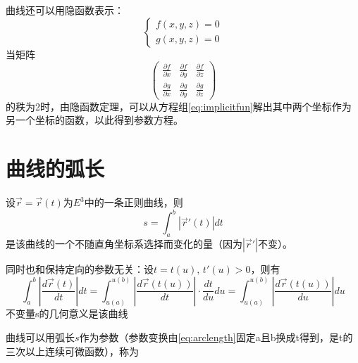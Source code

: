 \documentclass[12pt, a4paper, oneside]{ctexbook}
\newcommand{\hl}[1]{\hlbox{#1}}
\newcounter{#2}
\newcounter{#2}[#1]
\numberwithin{#2}{#1}
\newcommand{\pian}[2]{\frac{\partial #1}{\partial #2}}
\newcommand{\dao}[2]{\frac{d#1}{d#2}}
\newcommand{\ji}[2]{\int_{#1}^{#2}}
\begin{document}
            \begin{deduce}
                曲线还可以用隐函数表示：
                \begin{equation}\label{eq:implicitfun}
                    \begin{cases}
                        f(x,y,z)=0\\
                        g(x,y,z)=0
                    \end{cases}
                \end{equation}
                当矩阵
                \begin{equation}
                    \begin{pmatrix}
                        \pian fx&\pian fy &\pian fz\\
                        \pian gx &\pian gy &\pian gz
                    \end{pmatrix}
                \end{equation}
                的秩为2时，由隐函数定理，可以从方程组\autoref{eq:implicitfun}解出其中两个坐标作为另一个坐标的函数，以此得到参数方程。
            \end{deduce}

            \section{曲线的弧长}
            \begin{define}
                设\(\vec r=\vec r(t)\)为\(E^3\)中的一条正则曲线，则
                \begin{equation}\label{eq:arclength}
                    s=\ji ab|\vec r'(t)|dt
                \end{equation}
                是该曲线的一个不随直角坐标系选择而变化的量（因为\(|\vec r'|\)不变）。
                
                同时也和保持定向的参数无关：设\(t=t(u),\,t'(u)>0\)，则有
                \begin{equation*}
                    \ji ab\left|\dao{\vec r(t)}{t}\right| dt=\ji{u(a)}{u(b)}\left|\dao{\vec r(t(u))}{t}\right|\cdot \dao tu du =\ji{u(a)}{u(b)}\left|\dao{\vec r(t(u))}{u}\right| du
                \end{equation*}
                不变量s的几何意义是该曲线\hl{弧长}
            \end{define}
            \begin{define}
                曲线可以用弧长\(s\)作为参数（参数变换由\autoref{eq:arclength}固定a且b换成t得到，是t的三次以上连续可微函数），称为\hl{弧长参数}
            \end{define}
\end{document}
